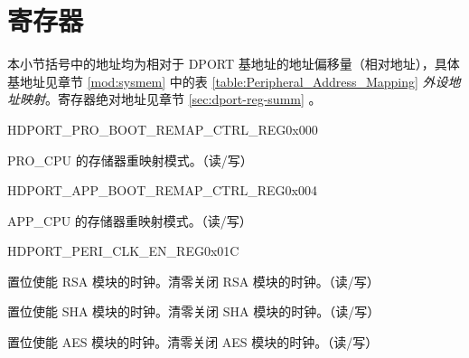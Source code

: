 \section{寄存器}\label{sec:dport-reg}

本小节括号中的地址均为相对于 DPORT 基地址的地址偏移量（相对地址），具体基地址见章节 \ref{mod:sysmem} \textit{} 中的表 \ref{table:Peripheral_Address_Mapping} \textit{外设地址映射}。寄存器绝对地址见章节 \ref{sec:dport-reg-summ} \textit{}。

\begin{register}{H}{DPORT\_PRO\_BOOT\_REMAP\_CTRL\_REG}{0x000}\label{regdesc:PROBOOTREMAPCTRLREG}
%
%
\regnewline%
\begin{regdesc}\begin{reglist}
\item [DPORT\_PRO\_BOOT\_REMAP] PRO\_CPU 的存储器重映射模式。（读/写）
\end{reglist}\end{regdesc}
\end{register}


\begin{register}{H}{DPORT\_APP\_BOOT\_REMAP\_CTRL\_REG}{0x004}\label{regdesc:APPBOOTREMAPCTRLREG}
%
%
\regnewline%
\begin{regdesc}\begin{reglist}
\item [DPORT\_APP\_BOOT\_REMAP] APP\_CPU 的存储器重映射模式。（读/写）
\end{reglist}\end{regdesc}
\end{register}


\begin{register}{H}{DPORT\_PERI\_CLK\_EN\_REG}{0x01C}\label{regdesc:PERICLKENREG}
%
%
%
%
\regnewline%
\begin{regdesc}\begin{reglist}
\item [DPORT\_PERI\_EN\_RSA] 置位使能 RSA 模块的时钟。清零关闭 RSA 模块的时钟。（读/写）
\item [DPORT\_PERI\_EN\_SHA] 置位使能 SHA 模块的时钟。清零关闭 SHA 模块的时钟。（读/写）
\item [DPORT\_PERI\_EN\_AES] 置位使能 AES 模块的时钟。清零关闭 AES 模块的时钟。（读/写）
\end{reglist}\end{regdesc}
\end{register}


